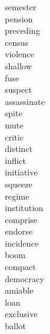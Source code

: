 \documentclass[a4paper, 10pt]{ctexart}
\begin{document}
\begin{multicols*}{2}
\begin{description}
\item[semester]

\item[pension]

\item[preceding]

\item[census]

\item[violence]

\item[shallow]

\item[fuse]

\item[suspect]

\item[assassinate]

\item[spite]

\item[mute]

\item[critic]

\item[distinct]

\item[inflict]

\item[initiative]

\item[squeeze]

\item[regime]

\item[institution]

\item[comprise]

\item[endorse]

\item[incidence]

\item[boom]

\item[compact]

\item[democracy]

\item[amiable]

\item[loan]

\item[exclusive]

\item[ballot]


\end{description}
\end{multicols*}
\end{document}
